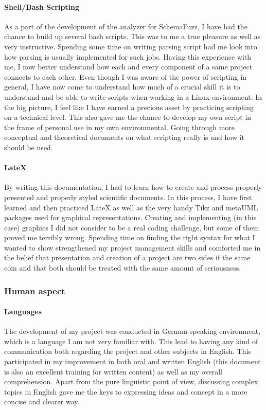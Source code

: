 			\paragraph{Shell/Bash Scripting} 
As a part of the development of the analyzer for SchemaFuzz, I have had the chance to build up several bash scripts. This  was to me a true pleasure as well as very instructive.
Spending some time on writing parsing script had me look into how parsing is usually implemented for such jobs.
Having this experience with me, I now better understand how each and every component of a same project connects to each other. 
Even though I was aware of the power of scripting in general, I have now come to understand how much of a crucial skill it is to understand and be able to write scripts when working in a Linux environment.
In the big picture, I feel like I have earned a precious asset by practicing scripting on a technical level. This also gave me the chance to develop my own script in the frame of personal use in my own environmental. Going through more conceptual and theoretical documents on what scripting really is and how it should be used.
   			
			 \paragraph{LateX}
By writing this documentation, I had to learn how to create and process properly presented and properly styled scientific documents. In this process, I have first learned and then practiced LateX as well as the very handy Tikz and metaUML packages used for graphical representations.
Creating and implementing (in this case) graphics I did not consider to be a real coding challenge, but some of them proved me terribly wrong. Spending time on finding the right syntax for what I wanted to show strengthened my project management skills and comforted me in the belief that presentation and creation of a project are two sides if the same coin and that both should be treated with the same amount of seriousness.  			  
	

		\subsubsection{Human aspect}
		
			\paragraph{Languages}
The development of my project was conducted in German-speaking environment, which is a language I am not very familiar with. 
This lead to having any kind of communication both regarding the project and other subjects in English. This participated in my improvement in both oral and written English (this document is also an excellent training for written content) as well as my overall comprehension.
Apart from the pure linguistic point of view, discussing complex topics in English gave me the keys to expressing ideas and concept in a more concise and clearer way. 			

